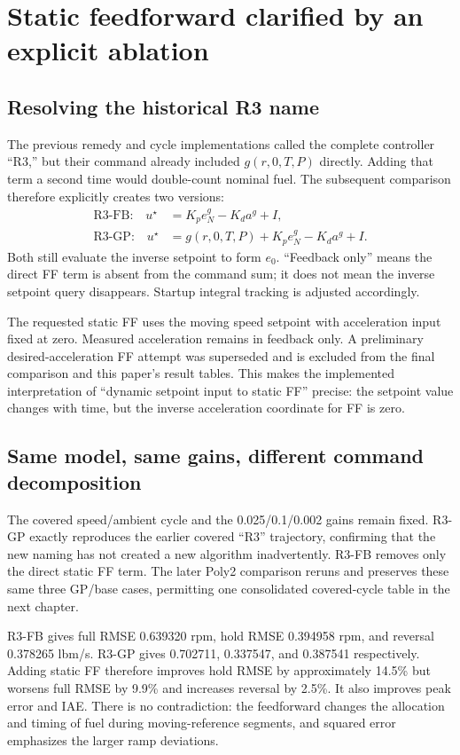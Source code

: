 \chapter{Static feedforward clarified by an explicit ablation}
\section{Resolving the historical R3 name}
The previous remedy and cycle implementations called the complete controller ``R3,'' but their command already included $g(r,0,T,P)$ directly. Adding that term a second time would double-count nominal fuel. The subsequent comparison therefore explicitly creates two versions:
\begin{align}
\text{R3-FB:}\quad u^\star&=K_pe_N^g-K_da^g+I,\\
\text{R3-GP:}\quad u^\star&=g(r,0,T,P)+K_pe_N^g-K_da^g+I.
\end{align}
Both still evaluate the inverse setpoint to form $e_0$. ``Feedback only'' means the direct FF term is absent from the command sum; it does not mean the inverse setpoint query disappears. Startup integral tracking is adjusted accordingly.

The requested static FF uses the moving speed setpoint with acceleration input fixed at zero. Measured acceleration remains in feedback only. A preliminary desired-acceleration FF attempt was superseded and is excluded from the final comparison and this paper's result tables. This makes the implemented interpretation of ``dynamic setpoint input to static FF'' precise: the setpoint value changes with time, but the inverse acceleration coordinate for FF is zero.

\section{Same model, same gains, different command decomposition}
The covered speed/ambient cycle and the 0.025/0.1/0.002 gains remain fixed. R3-GP exactly reproduces the earlier covered ``R3'' trajectory, confirming that the new naming has not created a new algorithm inadvertently. R3-FB removes only the direct static FF term. The later Poly2 comparison reruns and preserves these same three GP/base cases, permitting one consolidated covered-cycle table in the next chapter.

R3-FB gives full RMSE 0.639320 rpm, hold RMSE 0.394958 rpm, and reversal 0.378265 lbm/s. R3-GP gives 0.702711, 0.337547, and 0.387541 respectively. Adding static FF therefore improves hold RMSE by approximately 14.5\% but worsens full RMSE by 9.9\% and increases reversal by 2.5\%. It also improves peak error and IAE. There is no contradiction: the feedforward changes the allocation and timing of fuel during moving-reference segments, and squared error emphasizes the larger ramp deviations.


